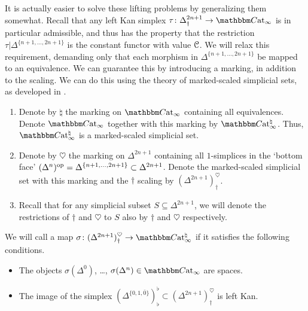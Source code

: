 \documentclass[main.tex]{subfiles}
\begin{document}
It is actually easier to solve these lifting problems by generalizing them somewhat. Recall that any left Kan simplex $\tau\colon \Delta^{2n+1}_{\dagger} \to \ICCat$ is in particular admissible, and thus has the property that the restriction $\tau|\Delta^{\{n+1, \ldots, 2n+1\}}$ is the constant functor with value $\mathcal{C}$. We will relax this requirement, demanding only that each morphism in $\Delta^{\{n+1, \ldots, 2n+1\}}$ be mapped to an equivalence. We can guarantee this by introducing a marking, in addition to the scaling. We can do this using the theory of marked-scaled simplicial sets, as developed in \cite{garcia20212}.

\begin{notation}
  \leavevmode
  \begin{enumerate}
    \item Denote by $\natural$ the marking on $\ICCat$ containing all equivalences. Denote $\ICCat$ together with this marking by $\ICCat^{\natural}$. Thus, $\ICCat^{\natural}$ is a marked-scaled simplicial set.

    \item Denote by $\heartsuit$ the marking on $\Delta^{2n+1}$ containing all $1$-simplices in the `bottom face' $(\Delta^{n})^{\mathrm{op}} = \Delta^{\{n+1, \ldots, 2n+1\}} \subset \Delta^{2n+1}$. Denote the marked-scaled simplicial set with this marking and the $\dagger$ scaling by $(\Delta^{2n+1})^{\heartsuit}_{\dagger}$.

    \item Recall that for any simplicial subset $S \subseteq \Delta^{2n+1}$, we will denote the restrictions of $\dagger$ and $\heartsuit$ to $S$ also by $\dagger$ and $\heartsuit$ respectively.
  \end{enumerate}
\end{notation}

\begin{definition}
  \label{def:weakly_left_kan}
  We will call a map $\sigma\colon (\Delta^{2n+1})^{\heartsuit}_{\dagger} \to \ICCat^{\natural}$  if it satisfies the following conditions.
  \begin{itemize}
    \item The objects $\sigma(\Delta^{0})$, \dots, $\sigma(\Delta^{n}) \in \ICCat$ are spaces.

    \item The image of the simplex $(\Delta^{\{0, 1, \overline{0}\}})^{\flat}_{\flat} \subset (\Delta^{2n+1})^{\heartsuit}_{\dagger}$ is left Kan.
  \end{itemize}
\end{definition}
\end{document}
